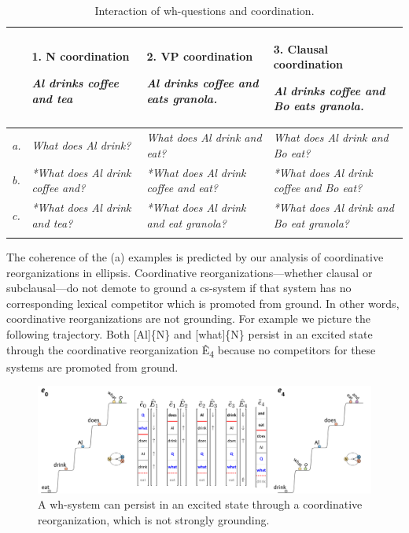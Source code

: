 \begin{table}
\begin{tabularx}{\textwidth}{lQQQ}
\lsptoprule
& 1. N coordination

\textit{Al drinks coffee and tea} & 2. VP coordination

\textit{Al drinks coffee and eats granola.} & 3. Clausal coordination

\textit{Al drinks coffee and Bo eats granola.}\\
\midrule 

\textit{a.} & \textit{What does Al drink?} & \textit{What does Al drink and eat?} & \textit{What does Al drink and Bo eat?}\\
\textit{b.} & \textit{*What does Al drink coffee and?} & \textit{*What does Al drink coffee and eat?} & \textit{*What does Al drink coffee and Bo eat?}\\
\textit{c.} & \textit{*What does Al drink and tea?} & \textit{*What does Al drink and eat granola?} & \textit{*What does Al drink and Bo eat granola?}\\
\lspbottomrule
\end{tabularx} 
\caption{Interaction of wh-questions and coordination.}\label{tab:7:6}
\end{table}

The coherence of the (a) examples is predicted by our analysis of coordinative reorganizations in ellipsis. Coordinative reorganizations—whether clausal or subclausal—do not demote to ground a cs-system if that system has no corresponding lexical competitor which is promoted from ground. In other words, coordinative reorganizations are not grounding. For example  we picture the following trajectory. Both [Al]\{N\} and [what]\{N\} persist in an excited state through the coordinative reorganization Ê\textsubscript{4} because no competitors for these systems are promoted from ground.

  
\begin{figure}
\includegraphics[width=\textwidth]{figures/Tilsen-img165.png}
\caption{A wh-system can persist in an excited state through a coordinative reorganization, which is not strongly grounding.}
\label{fig:7:21}
\end{figure}
 


